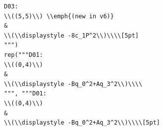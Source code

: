 \documentclass[10pt]{article}
\begin{document}
\begin{lstlisting}
D03:
\\((5,5)\\) \\emph{(new in v6)}
&
\\(\\displaystyle -8c_1P^2\\)\\\\[5pt]
""")
rep("""D01:
\\((0,4)\\)
&
\\(\\displaystyle -Bq_0^2+Aq_3^2\\)\\\\
""", """D01:
\\((0,4)\\)
&
\\(\\displaystyle -Bq_0^2+Aq_3^2\\)\\\\[5pt]


\end{lstlisting}
\end{document}
